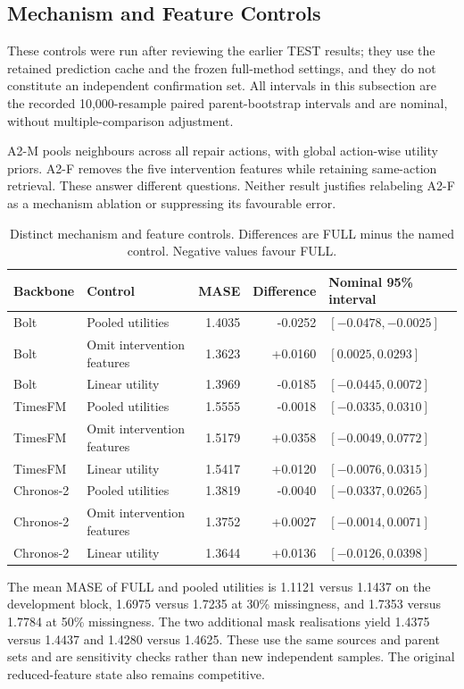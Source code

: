 \documentclass{article}
\begin{document}
\subsection{Mechanism and Feature Controls}
\label{app:estimation-analyses}
These controls were run after reviewing the earlier TEST results; they use the retained
prediction cache and the frozen full-method settings, and they do not constitute an
independent confirmation set. All intervals in this subsection are the recorded
10,000-resample paired parent-bootstrap intervals and are nominal, without
multiple-comparison adjustment.

A2-M pools neighbours across all repair actions, with global action-wise
utility priors. A2-F removes the five intervention features while
retaining same-action retrieval. These answer different questions. Neither result justifies
relabeling A2-F as a mechanism ablation or suppressing its favourable error.

\begin{table}[htbp]
\centering\small
\caption{Distinct mechanism and feature controls. Differences are FULL minus the named
control. Negative values favour FULL.}
\label{tab:v52-a2}
\begin{tabular}{llrrl}
\toprule
Backbone & Control & MASE & Difference & Nominal 95\% interval \\
\midrule
Bolt & Pooled utilities & 1.4035 & -0.0252 & $[-0.0478,-0.0025]$ \\
Bolt & Omit intervention features & 1.3623 & +0.0160 & $[0.0025,0.0293]$ \\
Bolt & Linear utility & 1.3969 & -0.0185 & $[-0.0445,0.0072]$ \\
TimesFM & Pooled utilities & 1.5555 & -0.0018 & $[-0.0335,0.0310]$ \\
TimesFM & Omit intervention features & 1.5179 & +0.0358 & $[-0.0049,0.0772]$ \\
TimesFM & Linear utility & 1.5417 & +0.0120 & $[-0.0076,0.0315]$ \\
Chronos-2 & Pooled utilities & 1.3819 & -0.0040 & $[-0.0337,0.0265]$ \\
Chronos-2 & Omit intervention features & 1.3752 & +0.0027 & $[-0.0014,0.0071]$ \\
Chronos-2 & Linear utility & 1.3644 & +0.0136 & $[-0.0126,0.0398]$ \\
\bottomrule
\end{tabular}
\end{table}

The mean MASE of FULL and pooled utilities is 1.1121 versus 1.1437 on the development block,
1.6975 versus 1.7235 at 30\% missingness, and 1.7353 versus 1.7784 at 50\% missingness.
The two additional mask realisations yield 1.4375 versus 1.4437 and 1.4280 versus 1.4625.
These use the same sources and parent sets and are sensitivity checks rather than new
independent samples. The original reduced-feature state also remains competitive.
\end{document}
